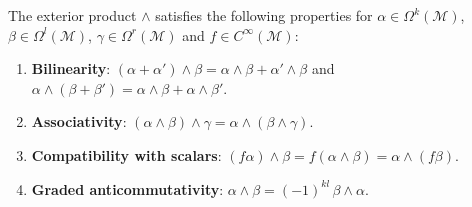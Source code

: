 \begin{proposition}\label{prop:propiedades_producto_exterior}
The exterior product $\wedge$ satisfies the following properties for $\alpha \in \Omega^k(\mathcal{M})$, $\beta \in \Omega^l(\mathcal{M})$, $\gamma \in \Omega^r(\mathcal{M})$ and $f \in C^\infty(\mathcal{M})$:
\begin{enumerate}
    \item \textbf{Bilinearity}: $(\alpha + \alpha') \wedge \beta = \alpha \wedge \beta + \alpha' \wedge \beta$ and $\alpha \wedge (\beta + \beta') = \alpha \wedge \beta + \alpha \wedge \beta'$.
    \item \textbf{Associativity}: $(\alpha \wedge \beta) \wedge \gamma = \alpha \wedge (\beta \wedge \gamma)$.
    \item \textbf{Compatibility with scalars}: $(f\alpha) \wedge \beta = f(\alpha \wedge \beta) = \alpha \wedge (f\beta)$.
    \item \textbf{Graded anticommutativity}: $\alpha \wedge \beta = (-1)^{kl}\, \beta \wedge \alpha$.
\end{enumerate}
\end{proposition}

